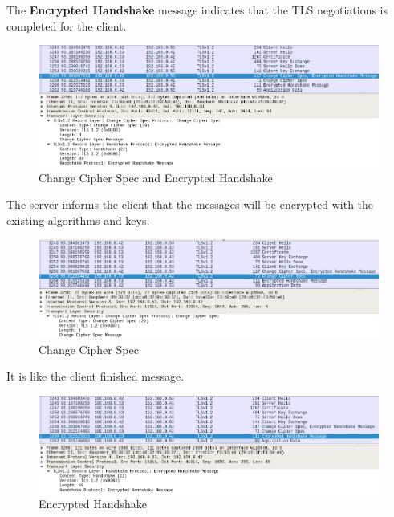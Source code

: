 \documentclass[a4paper,12pt]{article}
\begin{document}
The \textbf{Encrypted Handshake} message indicates that the TLS negotiations is completed for the client.
\begin{figure}[H]
    \centering
    \includegraphics[scale=0.400]{./code/img/client-change-cipher.png}
    \caption{Change Cipher Spec and Encrypted Handshake}
\end{figure}

The server informs the client that the messages will be encrypted with the existing algorithms and keys.
\begin{figure}[H]
    \centering
    \includegraphics[scale=0.400]{./code/img/server-change-cipher.png}
    \caption{Change Cipher Spec}
\end{figure}
It is like the client finished message.
\begin{figure}[H]
    \centering
    \includegraphics[scale=0.400]{./code/img/encrypted-handshake.png}
    \caption{Encrypted Handshake}
\end{figure}
\end{document}
